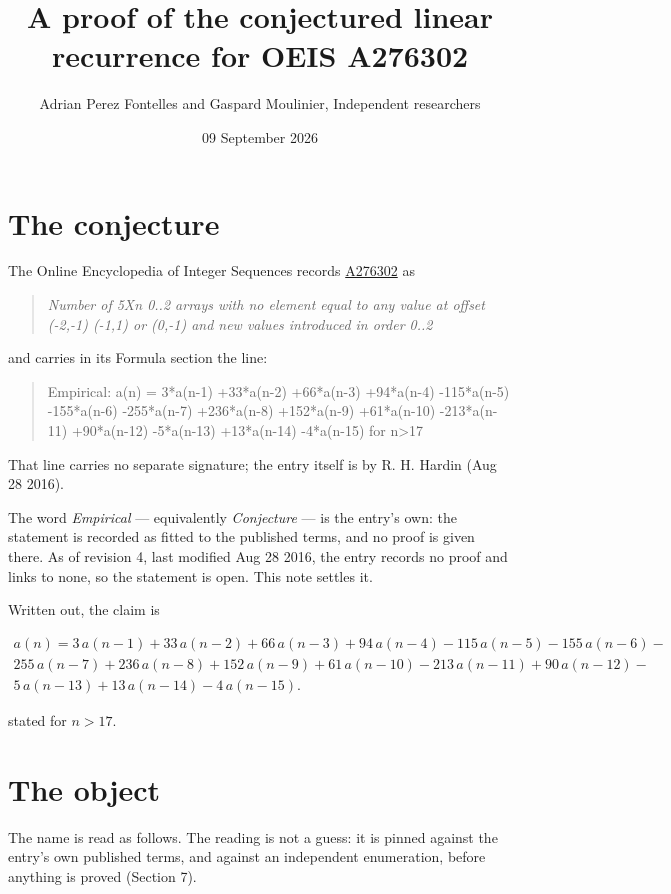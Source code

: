 \documentclass[11pt]{article}
\title{A proof of the conjectured linear recurrence for OEIS A276302}
\author{Adrian Perez Fontelles and Gaspard Moulinier, Independent researchers}
\date{09 September 2026}
\theoremstyle{definition}
\begin{document}
\maketitle
\section{The conjecture}

The Online Encyclopedia of Integer Sequences records \href{https://oeis.org/A276302}{A276302} as

\begin{quote}\itshape Number of 5Xn 0..2 arrays with no element equal to any value at offset (-2,-1) (-1,1) or (0,-1) and new values introduced in order 0..2\end{quote}

and carries in its Formula section the line:

\begin{quote}\ttfamily Empirical: a(n) = 3*a(n-1) +33*a(n-2) +66*a(n-3) +94*a(n-4) -115*a(n-5) -155*a(n-6) -255*a(n-7) +236*a(n-8) +152*a(n-9) +61*a(n-10) -213*a(n-11) +90*a(n-12) -5*a(n-13) +13*a(n-14) -4*a(n-15) for n>17\end{quote}

That line carries no separate signature; the entry itself is by R. H. Hardin (Aug 28 2016).

The word {\itshape Empirical} --- equivalently {\itshape Conjecture} --- is the entry's own: the statement is recorded as fitted to the published terms, and no proof is given there. As of revision 4, last modified Aug 28 2016, the entry records no proof and links to none, so the statement is open. This note settles it.

Written out, the claim is

\begin{multline*} a(n) = 3\,a(n-1) + 33\,a(n-2) + 66\,a(n-3) + 94\,a(n-4) - 115\,a(n-5) - 155\,a(n-6) - \\ 255\,a(n-7) + 236\,a(n-8) + 152\,a(n-9) + 61\,a(n-10) - 213\,a(n-11) + 90\,a(n-12) - \\ 5\,a(n-13) + 13\,a(n-14) - 4\,a(n-15). \end{multline*}

stated for $n > 17$.

\section{The object}

The name is read as follows. The reading is not a guess: it is pinned against the entry's own published terms, and against an independent enumeration, before anything is proved (Section 7).
\end{document}

